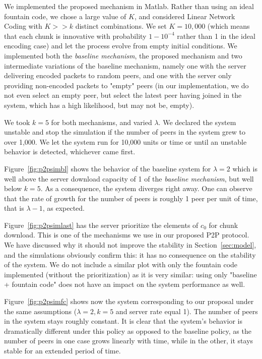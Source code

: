 \documentclass[11pt,conference]{IEEEtran}
\begin{document}
We implemented the proposed mechanism in Matlab. Rather than using an ideal fountain code, we chose a large value of $K$, and considered Linear Network Coding with $K >> k$ distinct combinations. We set $K= 10,000$ (which means that each chunk is innovative with probability $1-10^{-4}$ rather than 1 in the ideal encoding case) and let the process evolve from empty initial conditions. We implemented both the {\em baseline mechanism}, the proposed mechanism and two intermediate variations of the baseline mechanism, namely one with the server delivering encoded packets to random peers, and one with the server only providing non-encoded packets to "empty" peers (in our implementation, we do not even select an empty peer, but select the latest peer having joined in the system, which has a high likelihood, but may not be, empty).

We took $k = 5$ for both mechanisms, and varied $\lambda$. We declared the system unstable and stop the simulation if the number of peers in the system grew to over 1,000. We let the system run for 10,000 units or time or until an unstable behavior is detected, whichever came first.

Figure~\ref{fig:p2psimbl} shows the behavior of the baseline system for $\lambda = 2$ which is well above the server download capacity of 1 of the {\em baseline mechanism}, but well below $k = 5$. As a consequence, the system diverges right away. One can observe that the rate of growth for the number of peers is roughly 1 peer per unit of time, that is $\lambda - 1$, as expected.

Figure~\ref{fig:p2psimlast} has the server prioritize the elements of $c_0$ for chunk download. This is one of the mechanisms we use in our proposed P2P protocol. We have discussed why it should not improve the stability in Section~\ref{sec:model}, and the simulations obviously confirm this: it has no consequence on the stability of the system. We do not include a similar plot with only the fountain code implemented (without the prioritization) as it is very similar: using only "baseline + fountain code" does not have an impact on the system performance as well.

Figure~\ref{fig:p2psimfc} shows now the system corresponding to our proposal under the same assumptions ($\lambda = 2, k = 5$ and server rate equal 1). The number of peers in the system stays roughly constant. It is clear that the system's behavior is dramatically different under this policy as opposed to the baseline policy, as the number of peers in one case grows linearly with time, while in the other, it stays stable for an extended period of time.
\end{document}
